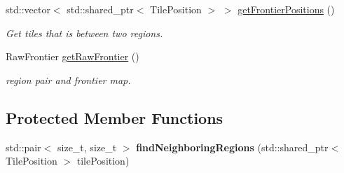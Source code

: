 \begin{DoxyCompactItemize}
std\+::vector$<$ std\+::shared\+\_\+ptr$<$ Tile\+Position $>$ $>$ \hyperlink{classOverseer_1_1Map_aa7872066386c1a6d3ee262eb1054130d}{get\+Frontier\+Positions} ()
\begin{DoxyCompactList}\small\item\em Get tiles that is between two regions. \end{DoxyCompactList}\item 
Raw\+Frontier \hyperlink{classOverseer_1_1Map_a7123e4389358218ad74ebce58680b6d2}{get\+Raw\+Frontier} ()
\begin{DoxyCompactList}\small\item\em region pair and frontier map. \end{DoxyCompactList}\end{DoxyCompactItemize}
\subsection*{Protected Member Functions}
\begin{DoxyCompactItemize}
\item 
std\+::pair$<$ size\+\_\+t, size\+\_\+t $>$ {\bfseries find\+Neighboring\+Regions} (std\+::shared\+\_\+ptr$<$ Tile\+Position $>$ tile\+Position)\hypertarget{classOverseer_1_1Map_af0b8210288ed4dfc7d68e5005614b4e3}{}\label{classOverseer_1_1Map_af0b8210288ed4dfc7d68e5005614b4e3}

\end{DoxyCompactItemize}
